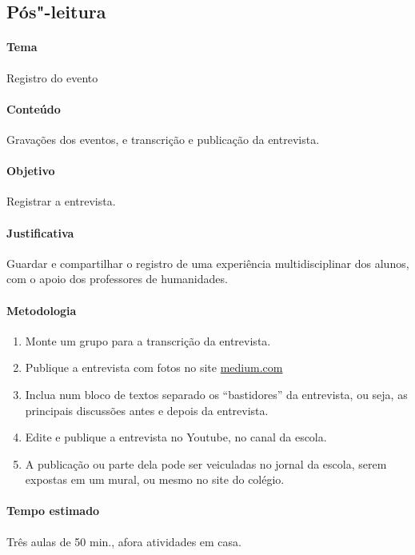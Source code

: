 \documentclass[12pt]{extarticle}
\begin{document}


\subsection{Pós"-leitura}

\paragraph{Tema} Registro do evento

\paragraph{Conteúdo} Gravações dos eventos, e transcrição e publicação da entrevista. 

\paragraph{Objetivo} Registrar a entrevista. 

\paragraph{Justificativa} Guardar e compartilhar o registro de uma experiência multidisciplinar 
	dos alunos, com o apoio dos professores de humanidades. 

\paragraph{Metodologia}
	\begin{enumerate}
		\item Monte um grupo para a transcrição da entrevista. 

		\item Publique a entrevista com fotos no site \href{https://medium.com/}{medium.com}
		\item Inclua num bloco de textos separado os ``bastidores'' da entrevista, ou seja, 
		as principais discussões antes e depois da entrevista. 
		\item Edite e publique a entrevista no Youtube, no canal da escola. 
		\item A publicação ou parte dela pode ser veiculadas no jornal da escola,
		serem expostas em um mural, ou mesmo no site do colégio.
	\end{enumerate}

\paragraph{Tempo estimado} Três aulas de 50 min., afora atividades em casa. 
\end{document}

